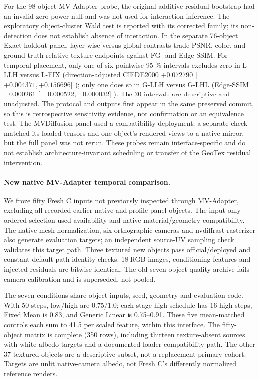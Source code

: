 \documentclass[times,twocolumn,final]{elsarticle}
\providecommand{\DIFadd}[1]{{\protect\color{blue} \sf #1}} %
\providecommand{\DIFaddbegin}{} %
\providecommand{\DIFaddend}{} %
\begin{document}
\DIFadd{For the 98-object MV-Adapter probe, the original additive-residual bootstrap had an invalid zero-power null and was not used for interaction inference. The exploratory object-cluster Wald test is reported with its corrected family; its non-detection does not establish absence of interaction. In }\DIFaddend the \DIFaddbegin \DIFadd{separate 76-object Exact-holdout panel, layer-wise versus global contrasts trade PSNR, color, and ground-truth-relative texture endpoints against FG- and Edge-SSIM. For temporal placement, only one of six pointwise }\DIFaddend 95  \DIFaddbegin \DIFadd{\% intervals excludes zero in L-LLH versus L-FIX (direction-adjusted CIEDE2000 $+0.072790$ }[\DIFadd{$+0.004371,+0.156696$}]\DIFadd{); only one does so in G-LLH versus G-LHL (Edge-SSIM $-0.000261$ }[\DIFadd{$-0.000522,-0.000032$}]\DIFadd{). The 30 intervals are descriptive and unadjusted. The protocol and outputs first appear in the same preserved commit, so this is retrospective sensitivity evidence, not confirmation or an equivalence test. The MVDiffusion panel used a compatibility deployment; a separate check matched its loaded tensors and one object's rendered views to a native mirror, but the full panel was not rerun. These probes remain interface-specific and do not establish architecture-invariant scheduling or transfer of the GeoTex residual intervention.
}


\paragraph{New native MV-Adapter temporal comparison.}
\label{subsec:new-mva}
\DIFadd{We froze fifty Fresh C inputs not previously inspected through MV-Adapter, excluding all recorded earlier native and profile-panel objects. The input-only ordered selection used availability and native material/geometry compatibility. The native mesh normalization, six orthographic cameras and nvdiffrast rasterizer also generate evaluation targets; an independent source-UV sampling check validates this target path. Three textured new objects pass official/deployed and constant-default-path identity checks: 18 RGB images, conditioning features and injected residuals are bitwise identical. The old seven-object quality archive fails camera calibration and is superseded, not pooled.
}

\DIFadd{The seven conditions share object inputs, seed, geometry and evaluation code. With 50 steps, low/high are 0.75/1.0; each stage-high schedule has 16 high steps, Fixed Mean is 0.83, and Generic Linear is 0.75--0.91. These five mean-matched controls each sum to 41.5 per scaled feature, within this interface. The fifty-object matrix is complete (350 rows), including thirteen texture-absent sources with white-albedo targets and a documented loader compatibility path. The other 37 textured objects are a descriptive subset, not a replacement primary cohort. Targets are unlit native-camera albedo, not Fresh C's differently normalized reference renders.
}
\end{document}
